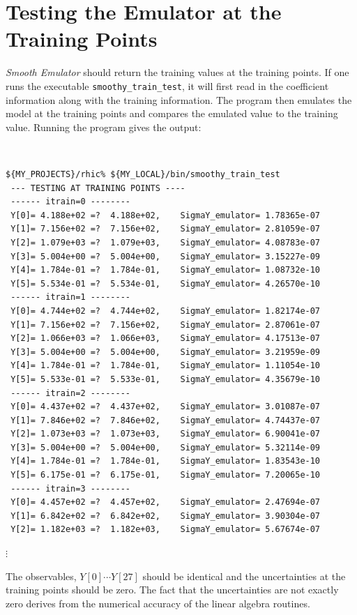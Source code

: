 \documentclass[UserManual.tex]{subfiles}
\begin{document}
\section{Testing the Emulator at the Training Points}
{\it Smooth Emulator} should return the training values at the training points. If one runs the executable {\tt smoothy\_train\_test}, it will first read in the coefficient information along with the training information. The program then emulates the model at the training points and compares the emulated value to the training value. Running the program gives the output:
{\tt
\begin{verbatim}
${MY_PROJECTS}/rhic% ${MY_LOCAL}/bin/smoothy_train_test
 --- TESTING AT TRAINING POINTS ----
 ------ itrain=0 --------
 Y[0]= 4.188e+02 =?  4.188e+02,    SigmaY_emulator= 1.78365e-07
 Y[1]= 7.156e+02 =?  7.156e+02,    SigmaY_emulator= 2.81059e-07
 Y[2]= 1.079e+03 =?  1.079e+03,    SigmaY_emulator= 4.08783e-07
 Y[3]= 5.004e+00 =?  5.004e+00,    SigmaY_emulator= 3.15227e-09
 Y[4]= 1.784e-01 =?  1.784e-01,    SigmaY_emulator= 1.08732e-10
 Y[5]= 5.534e-01 =?  5.534e-01,    SigmaY_emulator= 4.26570e-10
 ------ itrain=1 --------
 Y[0]= 4.744e+02 =?  4.744e+02,    SigmaY_emulator= 1.82174e-07
 Y[1]= 7.156e+02 =?  7.156e+02,    SigmaY_emulator= 2.87061e-07
 Y[2]= 1.066e+03 =?  1.066e+03,    SigmaY_emulator= 4.17513e-07
 Y[3]= 5.004e+00 =?  5.004e+00,    SigmaY_emulator= 3.21959e-09
 Y[4]= 1.784e-01 =?  1.784e-01,    SigmaY_emulator= 1.11054e-10
 Y[5]= 5.533e-01 =?  5.533e-01,    SigmaY_emulator= 4.35679e-10
 ------ itrain=2 --------
 Y[0]= 4.437e+02 =?  4.437e+02,    SigmaY_emulator= 3.01087e-07
 Y[1]= 7.846e+02 =?  7.846e+02,    SigmaY_emulator= 4.74437e-07
 Y[2]= 1.073e+03 =?  1.073e+03,    SigmaY_emulator= 6.90041e-07
 Y[3]= 5.004e+00 =?  5.004e+00,    SigmaY_emulator= 5.32114e-09
 Y[4]= 1.784e-01 =?  1.784e-01,    SigmaY_emulator= 1.83543e-10
 Y[5]= 6.175e-01 =?  6.175e-01,    SigmaY_emulator= 7.20065e-10
 ------ itrain=3 --------
 Y[0]= 4.457e+02 =?  4.457e+02,    SigmaY_emulator= 2.47694e-07
 Y[1]= 6.842e+02 =?  6.842e+02,    SigmaY_emulator= 3.90304e-07
 Y[2]= 1.182e+03 =?  1.182e+03,    SigmaY_emulator= 5.67674e-07
\end{verbatim}
$\vdots$
}
The observables, $Y[0]\cdots Y[27]$ should be identical and the uncertainties at the training points should be zero. The fact that the uncertainties are not exactly zero derives from the numerical accuracy of the linear algebra routines.
\end{document}
